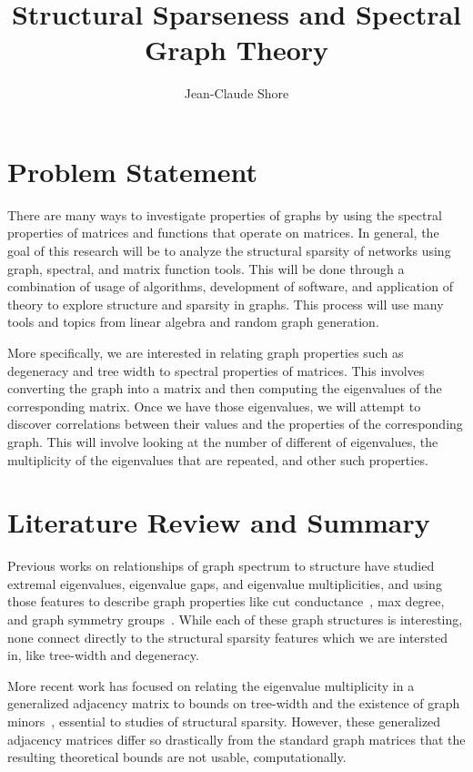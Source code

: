 \documentclass[a4paper,10pt]{article}
\title{Structural Sparseness and Spectral Graph Theory}
\author{Jean-Claude Shore}
\begin{document}
	\maketitle
	\section{Problem Statement}

	There are many ways to investigate properties of graphs by using the spectral properties of matrices and functions that operate on matrices.  In general, the goal of this research will be to analyze the structural sparsity of networks using graph, spectral, and matrix function tools.  This will be done through a combination of usage of algorithms, development of software, and application of theory to explore structure and sparsity in graphs.  This process will use many tools and topics from linear algebra and random graph generation.

	More specifically, we are interested in relating graph properties such as degeneracy and tree width to spectral properties of matrices.  This involves converting the graph into a matrix and then computing the eigenvalues of the corresponding matrix.  Once we have those eigenvalues, we will attempt to discover correlations between their values and the properties of the corresponding graph.  This will involve looking at the number of different of eigenvalues, the multiplicity of the eigenvalues that are repeated, and other such properties.


	\section{Literature Review and Summary}

	Previous works on relationships of graph spectrum to structure have studied extremal eigenvalues, eigenvalue gaps, and eigenvalue multiplicities, and using those features to describe graph properties like cut conductance~\cite{fiedler1973algebraic,mihail1989conductance}, max degree, and graph symmetry groups~\cite{VANDAM1995139}. While each of these graph structures is interesting, none connect directly to the structural sparsity features which we are intersted in, like tree-width and degeneracy.

	More recent work has focused on relating the eigenvalue multiplicity in a generalized adjacency matrix to bounds on tree-width and the existence of graph minors~\cite{de1998multiplicities,hogben2005spectral,Hong2004281}, essential to studies of structural sparsity. However, these generalized adjacency matrices differ so drastically from the standard graph matrices that the resulting theoretical bounds are not usable, computationally.
\end{document}

